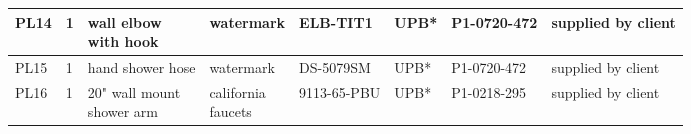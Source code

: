 \documentclass{article}
\begin{document}
\begin{sidewaystable}[h!]
\begin{center}
\begin{tabular}{l|l|l|l|l|l|l|l}
\hline
PL14 & 1  & \makecell[l]{wall elbow \\ with hook} & watermark & ELB-TIT1 & UPB* & P1-0720-472 & supplied by client \\
\hline
PL15 & 1  & hand shower hose & watermark & DS-5079SM  & UPB* & P1-0720-472 & supplied by client \\
\hline
PL16 & 1  & \makecell[l]{20" wall mount \\shower arm} & \makecell[l]{california \\ faucets} & 9113-65-PBU  &UPB* &  P1-0218-295  & supplied by client \\
\hline

\end{tabular}
\end{center}
\end{sidewaystable}
\end{document}
